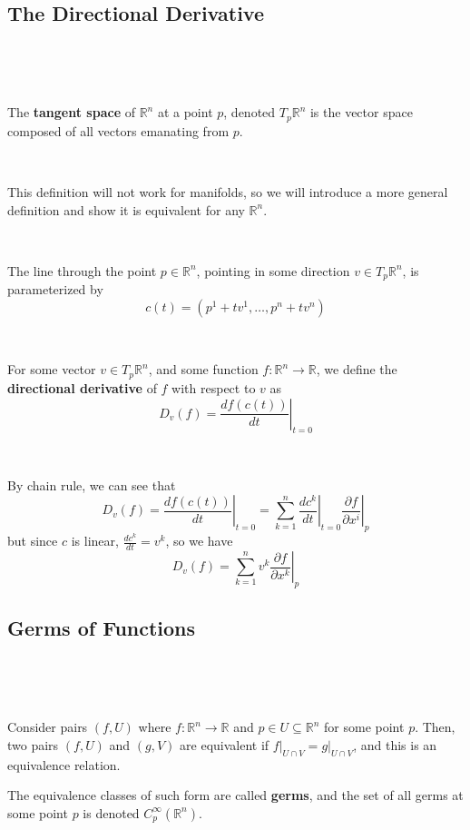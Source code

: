 \documentclass{article}
\begin{document}
\subsection{The Directional Derivative}
\

\begin{definition}
  \

  The \textbf{tangent space} of $\mathbb{R}^n$ at a point $p$, denoted $T_p\mathbb{R}^n$ is the vector space composed of all vectors emanating from $p$.

\end{definition}

\begin{remark}
  \

  This definition will not work for manifolds, so we will introduce a more general definition and show it is equivalent for any $\mathbb{R}^n$.
\end{remark}

\begin{proposition}
  \

  The line through the point $p \in \mathbb{R}^n$, pointing in some direction $v \in T_p \mathbb{R}^n$, is parameterized by $$c(t) = (p^1 + tv^1, \dots, p^n + tv^n)$$
\end{proposition}

\begin{definition}
  \

  For some vector $v \in T_p \mathbb{R}^n$, and some function $f: \mathbb{R}^n \to \mathbb{R}$, we define the \textbf{directional derivative} of $f$ with respect to $v$ as $$D_v(f) = \left. \frac{d f(c(t))}{dt} \right\vert_{t=0}$$
\end{definition}

\begin{proposition}
  \

  By chain rule, we can see that $$D_v(f) = \left.\frac{df(c(t))}{dt}\right\vert_{t=0} = \sum_{k=1}^n \left.\frac{dc^k}{dt}\right\vert_{t=0} \left.\frac{\partial f}{\partial x^i}\right\vert_p$$but since $c$ is linear, $\frac{dc^k}{dt} = v^k$, so we have $$D_v(f) = \sum_{k=1}^n v^k \left.\frac{\partial f}{\partial x^k}\right\vert_p$$
\end{proposition}

\subsection{Germs of Functions}
\

\begin{definition}[Germs]
  \

  Consider pairs $(f,U)$ where $f: \mathbb{R}^n \to \mathbb{R}$ and $p \in U \subseteq \mathbb{R}^n$ for some point $p$. Then, two pairs $(f,U)$ and $(g,V)$ are equivalent if $f \vert_{U \cap V} = g \vert_{U \cap V}$, and this is an equivalence relation.

  The equivalence classes of such form are called \textbf{germs}, and the set of all germs at some point $p$ is denoted $C^\infty_p(\mathbb{R}^n)$.
\end{definition}
\end{document}
